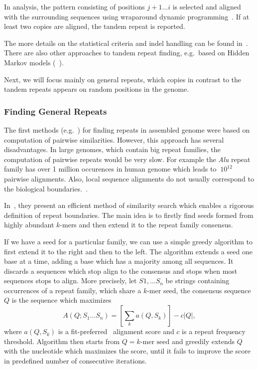 In analysis, the pattern consisting of positions $j+1\dots i$ is selected and aligned with the surrounding sequences using wraparound dynamic programming~\cite{fischetti1992apostolico, myers1989approximate}. If at least two copies are aligned, the tandem repeat is reported.

The more details on the statistical criteria and indel handling can be found in~\cite{trf}. There are also other approaches to tandem repeat finding, e.g.\ based on Hidden Markov models (~\cite{tantan, nanasi2014probabilistic}).

Next, we will focus mainly on general repeats, which copies in contrast to the tandem repeats appears on random positions in the genome.

\subsubsection{Finding General Repeats}

The first methods (e.g.~\cite{reputer, repeatfinder, recon, repeatgluer, piler}) for finding repeats in assembled genome were based on computation of pairwise similarities. However, this approach has several disadvantages. In large genomes, which contain big repeat families, the computation of pairwise repeats would be very slow. For example the \textit{Alu} repeat family has over 1 million occurences in human genome which leads to $~10^{12}$ pairwise alignments.
Also, local sequence alignments do not usually correspond to the biological boundaries.~\cite{recon}.

In~\cite{repscout}, they present an efficient method of similarity search which enables a rigorous definition of repeat boundaries. The main idea is to firstly find seeds formed from highly abundant $k$-mers and then extend it to the repeat family consensus.

If we have a seed for a particular family, we can use a simple greedy algorithm to first extend it to the right and then to the left. The algorithm extends a seed one base at a time, adding a base which has a majority among all sequences. It discards a sequences which stop align to the consensus and stops when most sequences stops to align. More precisely, let $S1,\dots S_n$ be strings containing occurrences of a repeat family, which share a $k$-mer seed, the consensus sequence $Q$ is the sequence which maximizes
$$A(Q; S_1 \dots S_n) = \left[\sum_k a(Q, S_k)\right] - c |Q|,$$
where $a(Q, S_k)$ is a fit-preferred~\cite{repscout} alignment score and $c$ is a repeat frequency threshold.
Algorithm then starts from $Q = \text{$k$-mer seed}$ and greedily extends $Q$ with the nucleotide which maximizes the score, until it fails to improve the score in predefined number of consecutive iterations.

